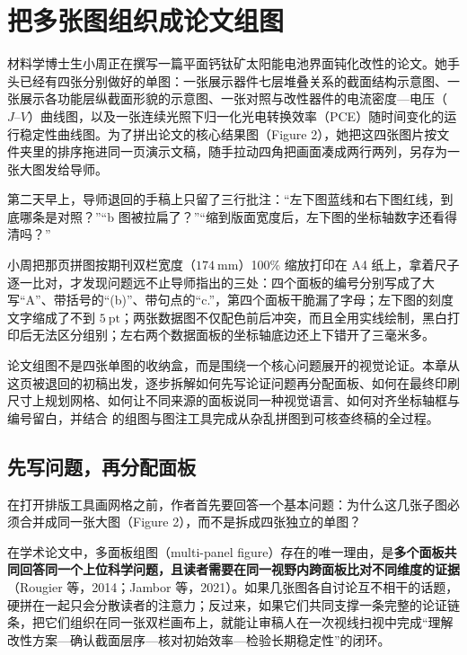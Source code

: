 \chapter{把多张图组织成论文组图}
\usetikzlibrary{patterns}
\providecommand{\ding}[1]{$\times$}
\providecommand{\sout}[1]{\leavevmode\begingroup\sbox0{#1}\hbox{\copy0\kern-\wd0\rule[0.5ex]{\wd0}{0.4pt}}\endgroup}

材料学博士生小周正在撰写一篇平面钙钛矿太阳能电池界面钝化改性的论文。她手头已经有四张分别做好的单图：一张展示器件七层堆叠关系的截面结构示意图、一张展示各功能层纵截面形貌的示意图、一张对照与改性器件的电流密度—电压（$J\text{--}V$）曲线图，以及一张连续光照下归一化光电转换效率（PCE）随时间变化的运行稳定性曲线图。为了拼出论文的核心结果图（Figure 2），她把这四张图片按文件夹里的排序拖进同一页演示文稿，随手拉动四角把画面凑成两行两列，另存为一张大图发给导师。

第二天早上，导师退回的手稿上只留了三行批注：“左下图蓝线和右下图红线，到底哪条是对照？”“b 图被拉扁了？”“缩到版面宽度后，左下图的坐标轴数字还看得清吗？”

小周把那页拼图按期刊双栏宽度（$174\ \text{mm}$）100\% 缩放打印在 A4 纸上，拿着尺子逐一比对，才发现问题远不止导师指出的三处：四个面板的编号分别写成了大写“A”、带括号的“(b)”、带句点的“c.”，第四个面板干脆漏了字母；左下图的刻度文字缩成了不到 $5\ \text{pt}$；两张数据图不仅配色前后冲突，而且全用实线绘制，黑白打印后无法区分组别；左右两个数据面板的坐标轴底边还上下错开了三毫米多。

论文组图不是四张单图的收纳盒，而是围绕一个核心问题展开的视觉论证。本章从这页被退回的初稿出发，逐步拆解如何先写论证问题再分配面板、如何在最终印刷尺寸上规划网格、如何让不同来源的面板说同一种视觉语言、如何对齐坐标轴框与编号留白，并结合 \scidraw{} 的组图与图注工具完成从杂乱拼图到可核查终稿的全过程。

\section{先写问题，再分配面板}

在打开排版工具画网格之前，作者首先要回答一个基本问题：为什么这几张子图必须合并成同一张大图（Figure 2），而不是拆成四张独立的单图？

在学术论文中，多面板组图（multi-panel figure）存在的唯一理由，是\textbf{多个面板共同回答同一个上位科学问题，且读者需要在同一视野内跨面板比对不同维度的证据}（Rougier 等，2014；Jambor 等，2021）。如果几张图各自讨论互不相干的话题，硬拼在一起只会分散读者的注意力；反过来，如果它们共同支撑一条完整的论证链条，把它们组织在同一张双栏画布上，就能让审稿人在一次视线扫视中完成“理解改性方案—确认截面层序—核对初始效率—检验长期稳定性”的闭环。

